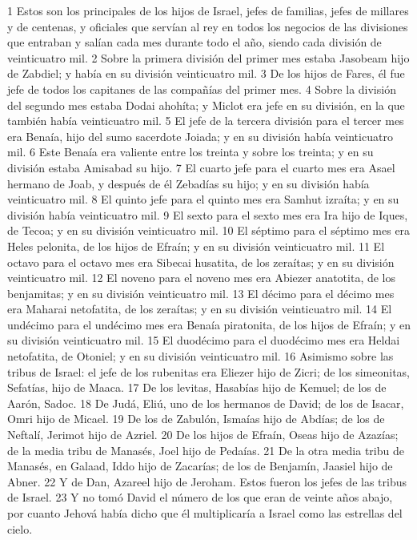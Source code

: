 1 Estos son los principales de los hijos de Israel, jefes de familias, jefes de millares y de centenas, y oficiales que servían al rey en todos los negocios de las divisiones que entraban y salían cada mes durante todo el año, siendo cada división de veinticuatro mil.
2 Sobre la primera división del primer mes estaba Jasobeam hijo de Zabdiel; y había en su división veinticuatro mil.
3 De los hijos de Fares, él fue jefe de todos los capitanes de las compañías del primer mes.
4 Sobre la división del segundo mes estaba Dodai ahohíta; y Miclot era jefe en su división, en la que también había veinticuatro mil.
5 El jefe de la tercera división para el tercer mes era Benaía, hijo del sumo sacerdote Joiada; y en su división había veinticuatro mil.
6 Este Benaía era valiente entre los treinta y sobre los treinta; y en su división estaba Amisabad su hijo.
7 El cuarto jefe para el cuarto mes era Asael hermano de Joab, y después de él Zebadías su hijo; y en su división había veinticuatro mil.
8 El quinto jefe para el quinto mes era Samhut izraíta; y en su división había veinticuatro mil.
9 El sexto para el sexto mes era Ira hijo de Iques, de Tecoa; y en su división veinticuatro mil.
10 El séptimo para el séptimo mes era Heles pelonita, de los hijos de Efraín; y en su división veinticuatro mil.
11 El octavo para el octavo mes era Sibecai husatita, de los zeraítas; y en su división veinticuatro mil.
12 El noveno para el noveno mes era Abiezer anatotita, de los benjamitas; y en su división veinticuatro mil.
13 El décimo para el décimo mes era Maharai netofatita, de los zeraítas; y en su división veinticuatro mil.
14 El undécimo para el undécimo mes era Benaía piratonita, de los hijos de Efraín; y en su división veinticuatro mil.
15 El duodécimo para el duodécimo mes era Heldai netofatita, de Otoniel; y en su división veinticuatro mil.
16 Asimismo sobre las tribus de Israel: el jefe de los rubenitas era Eliezer hijo de Zicri; de los simeonitas, Sefatías, hijo de Maaca.
17 De los levitas, Hasabías hijo de Kemuel; de los de Aarón, Sadoc.
18 De Judá, Eliú, uno de los hermanos de David; de los de Isacar, Omri hijo de Micael.
19 De los de Zabulón, Ismaías hijo de Abdías; de los de Neftalí, Jerimot hijo de Azriel.
20 De los hijos de Efraín, Oseas hijo de Azazías; de la media tribu de Manasés, Joel hijo de Pedaías.
21 De la otra media tribu de Manasés, en Galaad, Iddo hijo de Zacarías; de los de Benjamín, Jaasiel hijo de Abner.
22 Y de Dan, Azareel hijo de Jeroham. Estos fueron los jefes de las tribus de Israel.
23 Y no tomó David el número de los que eran de veinte años abajo, por cuanto Jehová había dicho que él multiplicaría a Israel como las estrellas del cielo. 
